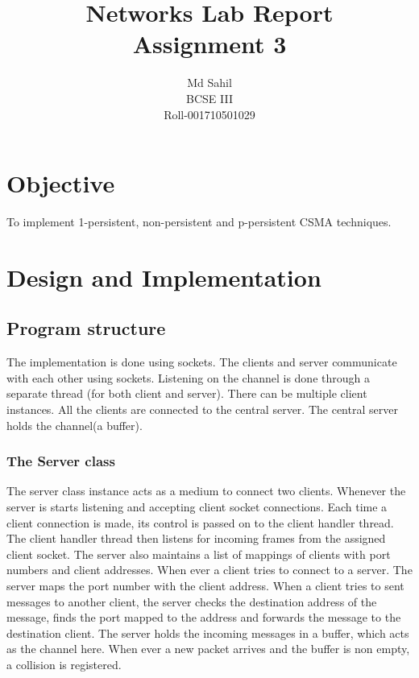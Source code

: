 \documentclass[14pt,titlepage, a4paper]{extarticle}
\title{Networks Lab Report\\Assignment 3}
\author{Md Sahil\\BCSE III\\Roll-001710501029}
\date{}
\begin{document}
{\maketitle}

\section{Objective}
To implement 1-persistent, non-persistent and p-persistent CSMA techniques.

\section{Design and Implementation}

\subsection{Program structure}
The implementation is done using sockets.
The clients and server communicate with each other using sockets.
Listening on the channel is done through a separate 
thread (for both client and server).
There can be multiple client instances. All the clients are connected to the
central server. The central server holds the channel(a buffer).


\subsubsection{The Server class}
The server class instance acts as a medium to connect two clients. 
Whenever the server is starts listening and accepting client socket
connections. Each time a client connection is made, its control is
passed on to the client handler thread. The client handler thread then 
listens for incoming frames from the assigned client socket.
The server also maintains a list of mappings of clients with port 
numbers and client addresses. When ever a client tries to connect to a server. 
The server maps the port number with the client address.
When a client tries to sent messages to another client, the server checks the
destination address of the message, finds the port mapped to the address
and forwards the message to the destination client.
The server holds the incoming messages in a buffer, which acts as the channel here.
When ever a new packet arrives and the buffer is non empty, a collision is registered.
\par\null\par
{}
\end{document}
